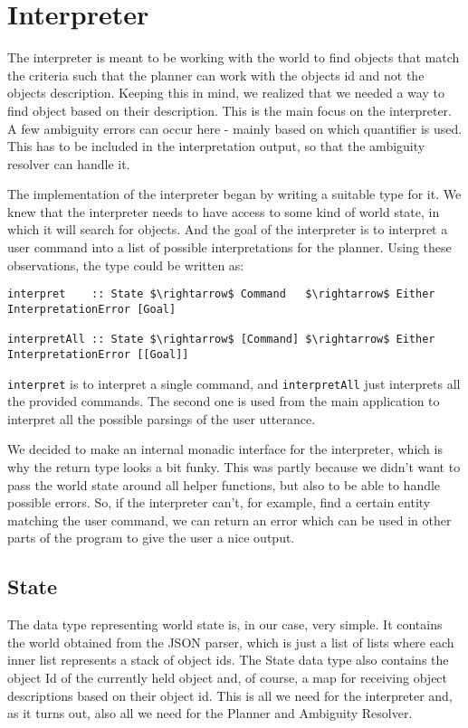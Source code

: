 \section*{Interpreter}


The interpreter is meant to be working with the world to find objects that match the criteria such that the planner can work with the objects id and not the objects description.
Keeping this in mind, we realized that we needed a way to find object based on their description.
This is the main focus on the interpreter. A few ambiguity errors can occur here - mainly based on which quantifier is used.
This has to be included in the interpretation output, so that the ambiguity resolver can handle it.

The implementation of the interpreter began by writing a suitable type for it.
We knew that the interpreter needs to have access to some kind of world state, in which it will search for objects.
And the goal of the interpreter is to interpret a user command into a list of possible interpretations for the planner.
Using these observations, the type could be written as:

\begin{lstlisting}
interpret    :: State $\rightarrow$ Command   $\rightarrow$ Either InterpretationError [Goal]

interpretAll :: State $\rightarrow$ [Command] $\rightarrow$ Either InterpretationError [[Goal]]
\end{lstlisting}

\verb|interpret| is to interpret a single command, and \verb|interpretAll| just interprets all the provided commands. The second one is used from the main application to interpret all the possible parsings of the user utterance.

We decided to make an internal monadic interface for the interpreter, which is why the return type looks a bit funky.
This was partly because we didn't want to pass the world state around all helper functions, but also to be able to handle possible errors.
So, if the interpreter can't, for example, find a certain entity matching the user command, we can return an error which can be used in other parts of the program to give the user a nice output.

\subsection*{State}
The data type representing world state is, in our case, very simple.
It contains the world obtained from the JSON parser, which is just a list of lists where each inner list represents a stack of object ids.
The State data type also contains the object Id of the currently held object and, of course, a map for receiving object descriptions based on their object id. This is all we need for the interpreter and, as it turns out, also all we need for the Planner and Ambiguity Resolver.


